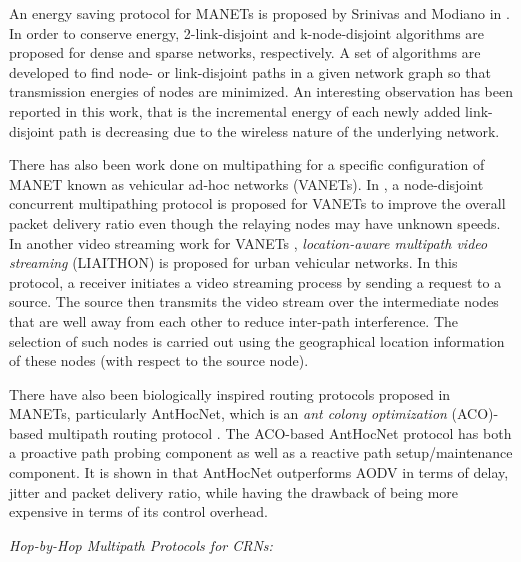 \documentclass[10pt]{IEEEtran}
\begin{document}
An energy saving protocol for MANETs is proposed by Srinivas and Modiano in \cite{srinivas2003minimum}. In order to conserve energy, 2-link-disjoint and k-node-disjoint algorithms are proposed for dense and sparse networks, respectively. A set of algorithms are developed to find node- or link-disjoint paths in a given network graph so that transmission energies of nodes are minimized. An interesting observation has been reported in this work, that is the incremental energy of each newly added link-disjoint path is decreasing due to the wireless nature of the underlying network. 

There has also been work done on multipathing for a specific configuration of MANET known as vehicular ad-hoc networks (VANETs). In \cite{huang2009performance}, a node-disjoint concurrent multipathing protocol is proposed for VANETs to improve the overall packet delivery ratio even though the relaying nodes may have unknown speeds. In another video streaming work for VANETs \cite{wang2012liaithon}, \textit{location-aware multipath video streaming} (LIAITHON) is proposed for urban vehicular networks. In this protocol, a receiver initiates a video streaming process by sending a request to a source. The source then transmits the video stream over the intermediate nodes that are well away from each other to reduce inter-path interference. The selection of such nodes is carried out using the geographical location information of these nodes (with respect to the source node).

There have also been biologically inspired routing protocols proposed in MANETs, particularly AntHocNet, which is an \textit{ant colony optimization} (ACO)-based multipath routing protocol \cite{di2005anthocnet, ducatelle2005ant}. The ACO-based AntHocNet protocol has both a proactive path probing component as well as a reactive path setup/maintenance component. It is shown in \cite{di2005anthocnet, ducatelle2005ant} that AntHocNet outperforms AODV in terms of delay, jitter and packet delivery ratio, while having the drawback of being more expensive in terms of its control overhead.

\vspace{2mm}
\textit{Hop-by-Hop Multipath Protocols for CRNs:}
\vspace{1mm}
\end{document}
